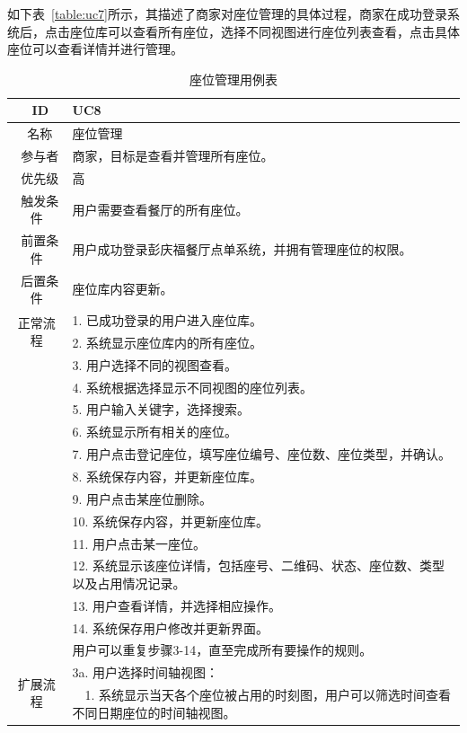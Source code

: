 如下表~\ref{table:uc7}所示，其描述了商家对座位管理的具体过程，商家在成功登录系统后，点击座位库可以查看所有座位，选择不同视图进行座位列表查看，点击具体座位可以查看详情并进行管理。

\begin{table}[htbp!]
  \footnotesize
  \centering
  \caption{座位管理用例表}
  \vspace{2mm}
  \begin{tabular}{cp{11.5cm}}
   \hline
   \ ID & UC8 \\ 
   \hline
   \ 名称 & 座位管理 \\ 
   \hline
   \ 参与者 & 商家，目标是查看并管理所有座位。 \\ 
   \hline
   \ 优先级 & 高 \\ 
   \hline
   \ 触发条件 & 用户需要查看餐厅的所有座位。 \\ 
   \hline
   \ 前置条件 & 用户成功登录彭庆福餐厅点单系统，并拥有管理座位的权限。 \\ 
   \hline
   \ 后置条件 & 座位库内容更新。 \\ 
   \hline
   \multirow{2}{*}{正常流程}
    & 1.	已成功登录的用户进入座位库。\\
    & 2.	系统显示座位库内的所有座位。\\
    & 3.	用户选择不同的视图查看。\\
    & 4.	系统根据选择显示不同视图的座位列表。\\
    & 5.  用户输入关键字，选择搜索。\\
    & 6.  系统显示所有相关的座位。\\
    & 7.  用户点击登记座位，填写座位编号、座位数、座位类型，并确认。\\
    & 8.  系统保存内容，并更新座位库。\\
    & 9.	用户点击某座位删除。\\
    & 10.	系统保存内容，并更新座位库。\\
    & 11.  用户点击某一座位。\\
    & 12.  系统显示该座位详情，包括座号、二维码、状态、座位数、类型以及占用情况记录。\\
    & 13.  用户查看详情，并选择相应操作。\\
    & 14.  系统保存用户修改并更新界面。\\
    & 用户可以重复步骤3-14，直至完成所有要操作的规则。\\
   \hline
   \multirow{2}{*}{扩展流程}
    & 3a. 用户选择时间轴视图：\\
    & ~~1.	系统显示当天各个座位被占用的时刻图，用户可以筛选时间查看不同日期座位的时间轴视图。\\

\end{tabular}
\end{table}
